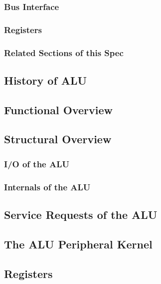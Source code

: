 \subsubsection{Bus Interface}

\subsubsection{Registers}

\subsubsection{Related Sections of this Spec}

\subsection{History of ALU}

\subsection{Functional Overview}
\label{subsec:alufunc01}

\subsection{Structural Overview}
\subsubsection{I/O of the ALU}

\subsubsection{Internals of the ALU}
%

\subsection{Service Requests of the ALU}

\subsection{The ALU Peripheral Kernel}



\subsection{Registers}


